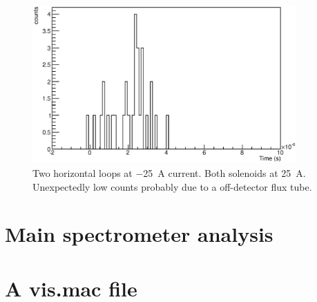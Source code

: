 \begin{figure}
\centering
	\includegraphics[width = 0.9\textwidth]{graphics/analysis/monSpec/ND.eps}
	\caption[\SI{50}{\ampere} loops]{Two horizontal loops at \SI{-25}{\ampere} current. Both solenoids at \SI{25}{\ampere}. Unexpectedly low counts probably due to a off-detector flux tube. }
	\label{fig:ND}
\end{figure}
\clearpage











\section{Main spectrometer analysis}
\label{ch:appendix:sec:mainSpec}


\section{A vis.mac file}
\label{ch:appendix:sec:vis.mac}

